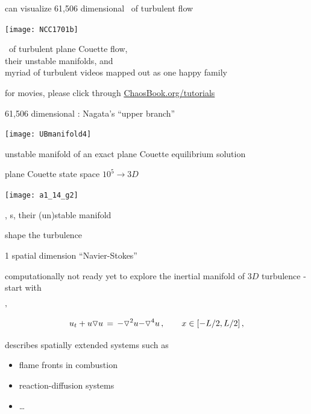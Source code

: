 \begin{frame}{can visualize 61,506 dimensional \statesp\ of turbulent flow}
\begin{center}
\texttt{[image: NCC1701b]}
\end{center}
\eqva\ of turbulent plane Couette flow,
\\
their unstable manifolds, and
\\
myriad of turbulent videos mapped out as one happy family

\bigskip

\hfill   {\small
          for movies, please click through
            \textcolor{blue}{\href{http://ChaosBook.org/tutorials}
             {ChaosBook.org/tutorials}}
          }
\end{frame}

\begin{frame}{61,506 dimensional : Nagata's ``upper branch''}
\begin{center}
\texttt{[image: UBmanifold4]}
\end{center}
unstable manifold of an exact plane Couette equilibrium solution
\end{frame}

\begin{frame}{plane Couette state space $10^5 \to 3D$}
\begin{center}
\texttt{[image: a1\_14\_g2]}
\end{center}
\eqva, \po s, their (un)stable manifold

\hfill   shape the turbulence
\end{frame}


\begin{frame}{1 spatial dimension ``Navier-Stokes''}

computationally not ready yet to explore the inertial manifold of $3D$
turbulence - start with

\bigskip

\begin{block}{\KSe'}
\[
  u_t + u \triangledown u \,=\,
    {\color{red}-}\triangledown^2 u {\color{red}-\triangledown^4 u}
    \,,\qquad   x \in [-L/2,L/2]
    \,,
\]
\end{block}

\bigskip

describes spatially extended systems such as
\begin{itemize}
 \item flame fronts in combustion
 \item reaction-diffusion systems
 \item \ldots
\end{itemize}

\end{frame}

